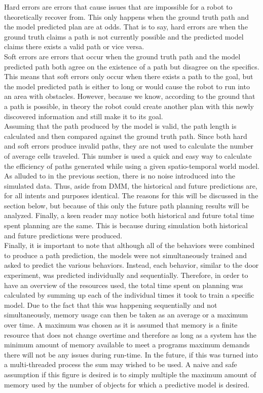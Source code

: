 Hard errors are errors that cause issues that are impossible for
a robot to theoretically recover from. This only happens when the ground truth
path and the model predicted plan are at odds. That is to say, hard errors are
when the ground truth claims a path is not currently possible and the predicted
model claims there exists a valid path or vice versa. \\

Soft errors are errors that occur when the ground truth path and the model
predicted path both agree on the existence of a path but disagree on the
specifics. This means that soft errors only occur when there exists a path
to the goal, but the model predicted path is either to long or would cause
the robot to run into an area with obstacles. However, because we know,
according to the ground that a path is possible, in theory the robot could
create another plan with this newly discovered information and still make it
to its goal. \\

Assuming that the path produced by the model is valid, the path
length is calculated and then compared against the ground truth path. Since
both hard and soft errors produce invalid paths, they are not used to
calculate the number of average cells traveled. This number is used a quick and
easy way to calculate the efficiency of paths generated while using a given
spatio-temporal world model. \\

As alluded to in the previous section, there is no noise introduced
into the simulated data. Thus, aside from DMM, the historical and future
predictions are, for all intents and purposes identical. The reasons for this
will be discussed in the section below, but because of this only the future
path planning results will be analyzed. Finally, a keen reader may notice both
historical and future total time spent planning are the same. This is because
during simulation both historical and future predictions were produced. \\

Finally, it is important to note that although all of the behaviors were
combined to produce a path prediction, the models were not simultaneously
trained and asked to predict the various behaviors. Instead, each behavior,
similar to the door experiment, was predicted individually and sequentially.
Therefore, in order to have an overview of the resources used, the total
time spent on planning was calculated by summing up each of the individual
times it took to train a specific model. Due to the fact that this was happening
sequentially and not simultaneously, memory usage can then be taken as an
average or a maximum over time. A maximum was chosen as it is assumed that
memory is a finite resource that does not change overtime and therefore as long
as a system has the minimum amount of memory available to meet a programs
maximum demands there will not be any issues during run-time. In the future,
if this was turned into a multi-threaded process the sum may wished to be
used. A naive and safe assumption if this figure is desired is to simply
multiple the maximum amount of memory used by the number of objects for which
a predictive model is desired. \\

